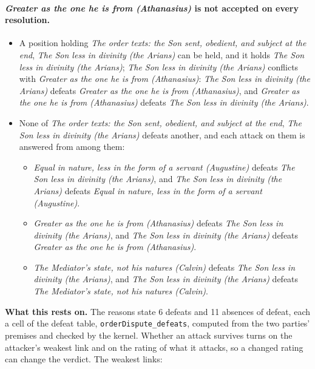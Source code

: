 \documentclass[11pt,paper=\testimonypaper,DIV=13,parskip=false]{scrartcl}
\begin{document}
\paragraph{\emph{Greater as the one he is from (Athanasius)} is not accepted on every resolution.}
\begin{itemize}
\item A position holding \emph{The order texts: the Son sent, obedient, and subject at the end}, \emph{The Son less in divinity (the Arians)} can be held, and it holds \emph{The Son less in divinity (the Arians)}; \emph{The Son less in divinity (the Arians)} conflicts with \emph{Greater as the one he is from (Athanasius)}: \emph{The Son less in divinity (the Arians)} defeats \emph{Greater as the one he is from (Athanasius)}, and \emph{Greater as the one he is from (Athanasius)} defeats \emph{The Son less in divinity (the Arians)}.
\item None of \emph{The order texts: the Son sent, obedient, and subject at the end}, \emph{The Son less in divinity (the Arians)} defeats another, and each attack on them is answered from among them:
\begin{itemize}
\item \emph{Equal in nature, less in the form of a servant (Augustine)} defeats \emph{The Son less in divinity (the Arians)}, and \emph{The Son less in divinity (the Arians)} defeats \emph{Equal in nature, less in the form of a servant (Augustine)}.
\item \emph{Greater as the one he is from (Athanasius)} defeats \emph{The Son less in divinity (the Arians)}, and \emph{The Son less in divinity (the Arians)} defeats \emph{Greater as the one he is from (Athanasius)}.
\item \emph{The Mediator’s state, not his natures (Calvin)} defeats \emph{The Son less in divinity (the Arians)}, and \emph{The Son less in divinity (the Arians)} defeats \emph{The Mediator’s state, not his natures (Calvin)}.
\end{itemize}
\end{itemize}
\par\noindent\textbf{What this rests on.} The reasons state 6 defeats and 11 absences of defeat, each a cell of the defeat table, \texttt{order\allowbreak{}Dispute\_\allowbreak{}defeats}, computed from the two parties' premises and checked by the kernel. Whether an attack survives turns on the attacker's weakest link and on the rating of what it attacks, so a changed rating can change the verdict. The weakest links:
\end{document}
